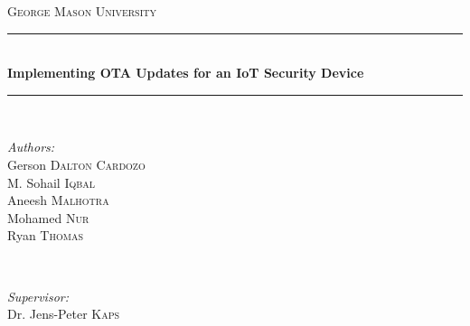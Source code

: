 \documentclass[11pt]{article}
\begin{document}
\begin{titlepage}

\newcommand{\HRule}{\rule{\linewidth}{0.5mm}} %

\center %
 

\textsc{\LARGE George Mason University}\\[1.5cm] %



\HRule \\[0.4cm]
{ \huge \bfseries Implementing OTA Updates for an IoT Security Device}\\[0.4cm] %
\HRule \\[1.5cm]
 

\begin{minipage}{0.4\textwidth}
\begin{flushleft} \large
\emph{Authors:}\\
Gerson \textsc{Dalton Cardozo} \\
M. Sohail \textsc{Iqbal} \\ 
Aneesh \textsc{Malhotra} \\ 
Mohamed \textsc{Nur} \\ 
Ryan \textsc{Thomas} %
\end{flushleft}
\end{minipage}
~
\begin{minipage}{0.4\textwidth}
\begin{flushright} \large
\emph{Supervisor:} \\
Dr. Jens-Peter \textsc{Kaps} %
\end{flushright}
\end{minipage}\\[2cm]



\end{titlepage}
\end{document}

